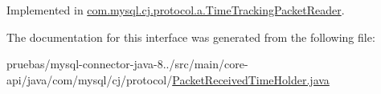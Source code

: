Implemented in \mbox{\hyperlink{classcom_1_1mysql_1_1cj_1_1protocol_1_1a_1_1_time_tracking_packet_reader_a3bd1be8166c894904064c43363adb821}{com.\+mysql.\+cj.\+protocol.\+a.\+Time\+Tracking\+Packet\+Reader}}.



The documentation for this interface was generated from the following file\+:\begin{DoxyCompactItemize}
\item 
pruebas/mysql-\/connector-\/java-\/8../src/main/core-\/api/java/com/mysql/cj/protocol/\mbox{\hyperlink{_packet_received_time_holder_8java}{Packet\+Received\+Time\+Holder.\+java}}\end{DoxyCompactItemize}
